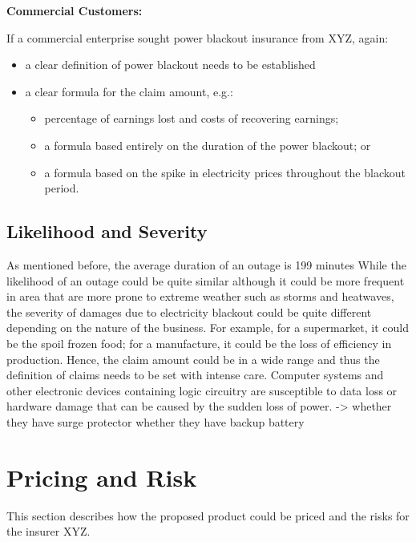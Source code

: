 \documentclass[12pt]{article}
\begin{document}
{\textbf{\large Commercial Customers:}}\par
\begin{flushleft}
If a commercial enterprise sought power blackout insurance from XYZ, again: 
\begin{itemize}
    \item a clear definition of power blackout needs to be established
    \item a clear formula for the claim amount, e.g.:
\begin{itemize}
    \item percentage of earnings lost and costs of recovering earnings;
    \item a formula based entirely on the duration of the power blackout; or
    \item a formula based on the spike in electricity prices throughout the blackout
period.
\end{itemize}
\end{itemize}

\end{flushleft}
\subsection{Likelihood and Severity}
As mentioned before, the average duration of an outage is 199 minutes 
While the likelihood of an outage could be quite similar although it could be more frequent in area that are more prone to extreme weather such as storms and heatwaves, the severity of damages due to electricity blackout could be quite different depending on the nature of the business. For example, for a supermarket, it could be the spoil frozen food; for a manufacture, it could be the loss of efficiency in production. Hence, the claim amount could be in a wide range and thus the definition of claims needs to be set with intense care.    
Computer systems and other electronic devices containing logic circuitry are susceptible to data loss or hardware damage that can be caused by the sudden loss of power. -> whether they have surge protector
whether they have backup battery 

\newpage


\section{Pricing and Risk}
This section describes how the proposed product could be priced and the risks for the insurer XYZ. 
\end{document}
